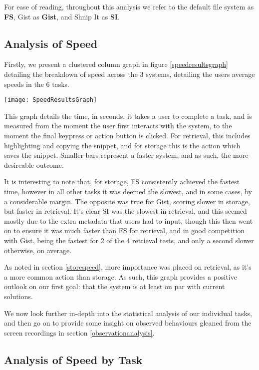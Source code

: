 For ease of reading, throughout this analysis we refer to the default file system as \textbf{FS}, Gist as \textbf{Gist}, and Shnip It as \textbf{SI}.

\subsection{Analysis of Speed}
Firstly, we present a clustered column graph in figure \ref{speedresultsgraph} detailing the breakdown of speed across the 3 systems, detailing the users average speeds in the 6 tasks.

\begin{sidewaysfigure}[htbp]
\centering
\texttt{[image: SpeedResultsGraph]}
\caption{Time taken in seconds per task performed, for each of the 3 systems \label{speedresultsgraph}}
\end{sidewaysfigure}

This graph details the time, in seconds, it takes a user to complete a task, and is measured from the moment the user first interacts with the system, to the moment the final keypress or action button is clicked. 
For retrieval, this includes highlighting and copying the snippet, and for storage this is the action which saves the snippet.
Smaller bars represent a faster system, and as such, the more desireable outcome.

It is interesting to note that, for storage, FS consistently achieved the fastest time, however in all other tasks it was deemed the slowest, and in some cases, by a considerable margin. 
The opposite was true for Gist, scoring slower in storage, but faster in retrieval.
It's clear SI was the slowest in retrieval, and this seemed mostly due to the extra metadata that users had to input, though this then went on to ensure it was much faster than FS for retrieval, and in good competition with Gist, being the fastest for 2 of the 4 retrieval tests, and only a second slower otherwise, on average.

As noted in section \ref{storespeed}, more importance was placed on retrieval, as it's a more common action than storage.
As such, this graph provides a positive outlook on our first goal: that the system is at least on par with current solutions. 

We now look further in-depth into the statistical analysis of our individual tasks, and then go on to provide some insight on observed behaviours gleaned from the screen recordings in section \ref{observationanalysis}.

\subsection{Analysis of Speed by Task}
